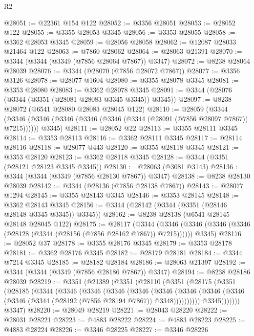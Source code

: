 \begin{lexlean}{R2}
\begin{coremodule}
@28051 := @22361 @154 @122
@28052 := @3356 @28051
@28053 := @28052 @122
@28055 := @3355 @28053 @3345
@28056 := @3353 @28055
@28058 := @3362 @28053 @3345
@28059 := @28056 @28058
@28062 := @12087 @28033 @21464 @122
@28063 := @7860 @28062
@28064 := @28063 @21391
@28070 := @3344 (@3344 (@3349 (@7856 @28064 @7867)) @3347)
@28072 := @8238 @28064 @28039
@28076 := @3344 (@28070 (@7856 @28072 @7867))
@28077 := @3356 @3126
@28078 := @28077 @1604
@28080 := @3355 @28078 @3345
@28081 := @3353 @28080
@28083 := @3362 @28078 @3345
@28091 := @3344 (@28076 (@3344 (@3351 (@28081 @28083 @3345 @3345)) @3345))
@28097 := @8238 @28072 (@6541 @28080 @28083 @28045 @122)
@28110 := @28059
    (@3344
      (@3346 (@3346 (@3346 (@3346 (@3346 (@3344 (@28091 (@7856 @28097 @7867)) @7215))))))
      @3345)
@28111 := @28052 @22
@28113 := @3355 @28111 @3345
@28114 := @3353 @28113
@28116 := @3362 @28111 @3345
@28117 := @28114 @28116
@28118 := @28077 @443
@28120 := @3355 @28118 @3345
@28121 := @3353 @28120
@28123 := @3362 @28118 @3345
@28128 := @3344 (@3351 (@28121 @28123 @3345 @3345))
@28130 := @28063 (@3081 @3143)
@28136 := @3344 (@3344 (@3349 (@7856 @28130 @7867)) @3347)
@28138 := @8238 @28130 @28039
@28142 := @3344 (@28136 (@7856 @28138 @7867))
@28143 := @28077 @1294
@28145 := @3355 @28143 @3345
@28146 := @3353 @28145
@28148 := @3362 @28143 @3345
@28156 := @3344 (@28142 (@3344 (@3351 (@28146 @28148 @3345 @3345)) @3345))
@28162 := @8238 @28138 (@6541 @28145 @28148 @28045 @122)
@28175 := @28117
    (@3344
      (@3346 (@3346 (@3346 (@3346 (@28128 (@3344 (@28156 (@7856 @28162 @7867)) @7215))))))
      @3345)
@28176 := @28052 @37
@28178 := @3355 @28176 @3345
@28179 := @3353 @28178
@28181 := @3362 @28176 @3345
@28182 := @28179 @28181
@28184 := @3344 @7214 @3345
@28185 := @28182 @28184
@28186 := @28063 @21397
@28192 := @3344 (@3344 (@3349 (@7856 @28186 @7867)) @3347)
@28194 := @8238 @28186 @28039
@28219 := @3351
    (@21389
      (@3351
        (@28110
          (@3351
            (@28175
              (@3351
                (@28185
                  (@3344
                    (@3346
                      (@3346
                        (@3346
                          (@3346
                            (@3346
                              (@3346
                                (@3346
                                  (@3346 (@3346 (@3344 (@28192 (@7856 @28194 @7867)) @3348))))))))))
                    @3345)))))))
      @3347)
@28220 := @28049 @28219
@28221 := @28043 @28220
@28222 := @28031 @28221
@28223 := @4883 @28222
@28224 := @4883 @28223
@28225 := @4883 @28224
@28226 := @3346 @28225
@28227 := @3346 @28226

\end{coremodule}
\end{lexlean}
